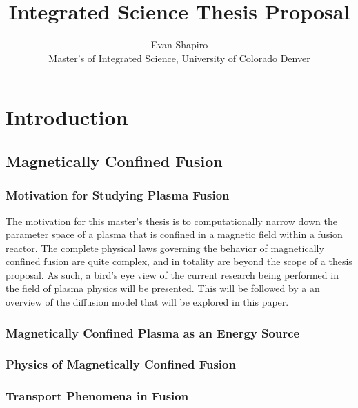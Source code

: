 \documentclass{article}
\title{Integrated Science Thesis Proposal}
\author{Evan Shapiro \\ Master's of Integrated Science, University of Colorado Denver}
\begin{document}
\maketitle
\tableofcontents
\section{Introduction}
\subsection{Magnetically Confined Fusion}
\subsubsection{Motivation for Studying Plasma Fusion}
The motivation for this master's thesis is to computationally narrow down the parameter space of a plasma that is confined in a magnetic field within a fusion reactor.
The complete physical laws governing the behavior of magnetically confined fusion are quite complex, and in totality are beyond the scope of a thesis proposal. 
As such, a bird's eye view of the current research being performed in the field of plasma physics will be presented. \cite{J_Friedberg:1}
This will be followed by a an overview of the diffusion model that will be explored in this paper.\\
\subsubsection{Magnetically Confined Plasma as an Energy Source}
\subsubsection{Physics of Magnetically Confined Fusion}
\subsubsection{Transport Phenomena in Fusion}


\newpage



\end{document}
